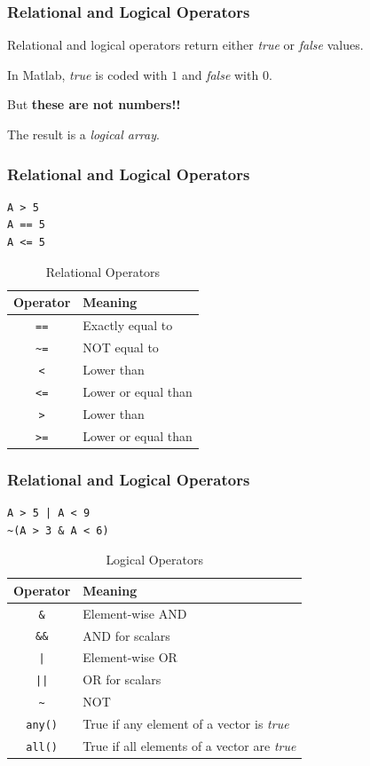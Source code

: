 \documentclass[11pt,xcolor={svgnames},aspectratio=169,usepdftitle=false]{beamer}
\let\toneitemize\itemize
\let\ttwoitemize\enditemize
\renewenvironment{itemize}{\toneitemize\addtolength{\itemsep}{1.35\baselineskip}}{\ttwoitemize}
\begin{document}
\begin{frame}
    \frametitle{Relational and Logical Operators}
\begin{itemize}
    \item Relational and logical operators return either \textit{true} or \textit{false} values.
    \item In Matlab, \textit{true} is coded with $1$ and \textit{false} with $0$.
    \item But \alert{\textbf{these are not numbers!!}}
    \item The result is a \textit{logical array}.
\end{itemize}
\end{frame}

\begin{frame}[fragile]
    \frametitle{Relational and Logical Operators}
\begin{lstlisting}
A > 5
A == 5
A <= 5
\end{lstlisting}

\begin{table}[htbp]
    \caption{Relational Operators}
    \label{tab:relational_operators}
    \begin{tabular}{@{}cl@{}}
    \toprule
    Operator & Meaning \\ \midrule
    \verb;==; & Exactly equal to \\
    \verb;~=; & NOT equal to \\
    \verb;<;  & Lower than \\
    \verb;<=; & Lower or equal than \\
    \verb;>;  & Lower than \\
    \verb;>=; & Lower or equal than \\ \bottomrule
    \end{tabular}
\end{table}
\end{frame}

\begin{frame}[fragile]
    \frametitle{Relational and Logical Operators}
\begin{lstlisting}
A > 5 | A < 9
~(A > 3 & A < 6)
\end{lstlisting}

\begin{table}[htbp]
    \caption{Logical Operators}
    \label{tab:logical_operators}
    \begin{tabular}{@{}cl@{}}
    \toprule
    Operator & Meaning \\ \midrule
    \verb;&; & Element-wise AND \\
    \verb;&&; & AND for scalars \\
    \verb;|;  & Element-wise OR \\
    \verb;||; & OR for scalars \\
    \verb;~;  & NOT \\ 
    \verb;any(); & True if any element of a vector is \textit{true} \\
    \verb;all(); & True if all elements of a vector are \textit{true} \\ \bottomrule
    \end{tabular}
\end{table}
\end{frame}
\end{document}
